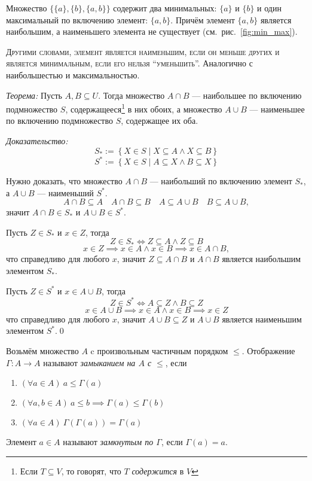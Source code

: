 Множество $\{\{a\},\{b\},\{a,b\}\}$ содержит
два минимальных: $\{a\}$ и $\{b\}$ и один максимальный
по включению элемент: $\{a,b\}$. Причём элемент $\{a,b\}$ является наибольшим, а
наименьшего элемента не существует (см.~рис.~\ref{fig:min_max}).

\textsc{Другими словами, элемент является наименьшим,
если он меньше других и является минимальным, если его нельзя
``уменьшить''.} Аналогично с наибольшестью и максимальностью.

\vspace{1em}
{\it Теорема:} Пусть $A,B\subseteq U$. Тогда множество $A\cap B$ ---
наибольшее по включению подмножество $S$, содержащееся\footnote{Если $T\subseteq V$,
то говорят, что $T$ {\it содержится} в $V$} в них обоих,
а множество $A\cup B$ --- наименьшее по включению подмножество $S$,
содержащее их оба.

{\it Доказательство:}
\[
	S_{*}:=\left\{X\in S\;\big|\; X\subseteq A\land X\subseteq B\right\}
\]
\[
	S^{*}:=\left\{X\in S\;\big|\; A\subseteq X\land B\subseteq X\right\}
\]

Нужно доказать, что множество $A\cap B$ --- наибольший по включению элемент $S_{*}$,
а $A\cup B$ --- наименьший $S^{*}$.
\[
	A\cap B\subseteq A\quad A\cap B\subseteq B\quad
	A\subseteq A\cup B\quad B\subseteq A\cup B,
\]
значит $A\cap B\in S_{*}$ и $A\cup B\in S^{*}$.

Пусть $Z\in S_{*}$ и $x\in Z$, тогда
\[
	Z\in S_{*}\iff Z\subseteq A\land Z\subseteq B
\]
\[
	x\in Z\implies x\in A\land x\in B\implies x\in A\cap B,
\]
что справедливо для любого $x$,
значит $Z\subseteq A\cap B$ и $A\cap B$ является наибольшим элементом $S_{*}$.

Пусть $Z\in S^{*}$ и $x\in A\cup B$, тогда
\[
	Z\in S^{*}\iff A\subseteq Z\land B\subseteq Z
\]
\[
	x\in A\cup B\implies x\in A\land x\in B\implies x\in Z
\]
что справедливо для любого $x$,
значит $A\cup B\subseteq Z$ и $A\cup B$ является наименьшим элементом $S^{*}$.\qed

Возьмём множество $A$ c произвольным частичным порядком $\leq$. Отображение
$\Gamma:A\to A$ называют {\it замыканием на $A$ с $\leq$}, если
\begin{enumerate}
	\item{}$(\forall a\in A)~a\leq\Gamma(a)$
	\item{}$(\forall a,b\in A)~a\leq b\implies \Gamma(a)\leq \Gamma(b)$
	\item{}$(\forall a\in A)~\Gamma(\Gamma(a))=\Gamma(a)$
\end{enumerate}
Элемент ${a\in A}$ называют {\it замкнутым по $\Gamma$}, если ${\Gamma(a)=a}$.

